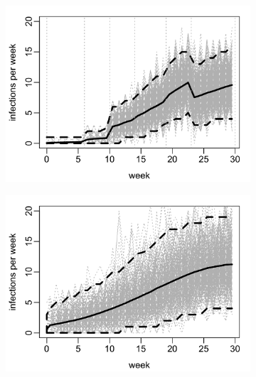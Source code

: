 \documentclass{uwstat572}
\begin{document}
\begin{figure}[t!]
	\centering
	\begin{subfigure}[b]{0.49\textwidth}
		\includegraphics[width=\textwidth]{figures/figure_4a.png}
		\caption{}
		\label{fig:cond_infections}
	\end{subfigure}
	\hfill
	\begin{subfigure}[b]{0.49\textwidth}
		\includegraphics[width=\textwidth]{figures/figure_4b.png}
		\caption{}
		\label{fig:sim_infection}
	\end{subfigure}
	\qquad
	\begin{subfigure}[b]{0.49\textwidth}

\end{subfigure}
\end{figure}
\end{document}
